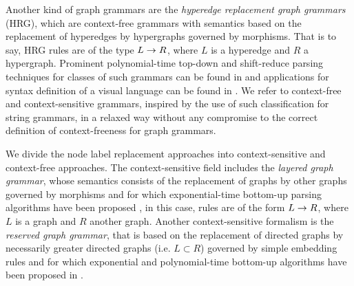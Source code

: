 Another kind of graph grammars are the \textit{hyperedge replacement graph grammars} (HRG), which are context-free grammars with semantics based on the replacement of hyperedges by hypergraphs \cite{drewes1997hyperedge} governed by morphisms. That is to say, HRG rules are of the type $L \to R$, where $L$ is a hyperedge and $R$ a hypergraph. Prominent polynomial-time top-down and shift-reduce parsing techniques for classes of such grammars can be found in \cite{drewes2015predictive, drewes2017predictive, bjorklund2016between, chiang2013parsing} and applications for syntax definition of a visual language can be found in \cite{minas2006syntax,engelfriet1998tree}. We refer to context-free and context-sensitive grammars, inspired by the use of such classification for string grammars, in a relaxed way without any compromise to the correct definition of context-freeness for graph grammars.

We divide the node label replacement approaches into context-sensitive and context-free approaches. The context-sensitive field includes the \textit{layered graph grammar}, whose semantics consists of the replacement of graphs by other graphs governed by morphisms \cite{rekers1997defining} and for which exponential-time bottom-up parsing algorithms have been proposed \cite{rekers1995graph,bottoni2000efficient,furst2011improving}, in this case, rules are of the form $L \to R$, where $L$ is a graph and $R$ another graph. Another context-sensitive formalism is the \textit{reserved graph grammar}, that is based on the replacement of directed graphs by necessarily greater directed graphs (i.e. $L \subset R$) governed by simple embedding rules \cite{zhang2001context} and for which exponential and polynomial-time bottom-up algorithms have been proposed in \cite{zeng2005rgg+,zou2017partial}.

